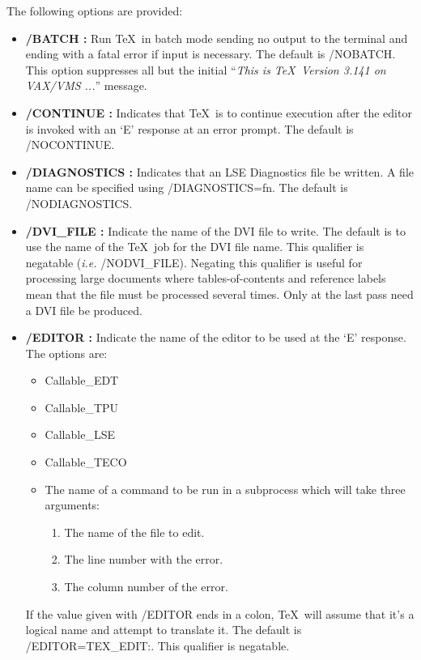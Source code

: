 The following options are provided:
\begin{itemize}

\item  {\bf   /BATCH :} Run \TeX\ in batch mode sending no output to the
terminal and ending with a fatal error if input is necessary. The default 
is /NOBATCH. This option suppresses all but the initial ``{\em This is \TeX\,
Version 3.141 on VAX/VMS ...}\/'' message.

\item  {\bf   /CONTINUE :} Indicates that \TeX\ is to continue execution after
the editor is invoked with an `E' response at an error prompt. The default is 
/NOCONTINUE.

\item  {\bf   /DIAGNOSTICS :} Indicates that an LSE Diagnostics file be
written. A file name can be specified using /DIAGNOSTICS=fn. The default is 
/NODIAGNOSTICS.

\item  {\bf   /DVI\_FILE :} Indicate the name of the DVI file to write.
The default is to use the name of the \TeX\ job for the DVI file name. 
This qualifier is negatable ({\em i.e.} /NODVI\_FILE). Negating this qualifier 
is useful for processing large documents where tables-of-contents and 
reference labels mean that the file must be processed several times. Only at 
the last pass need a DVI file be produced.

\item  {\bf   /EDITOR :} Indicate the name of the editor to be used at the `E'
response. The options are:
\begin{itemize}
\item Callable\_EDT
\item Callable\_TPU
\item Callable\_LSE
\item Callable\_TECO
\item The name of a command to be run in a subprocess which will 
take three arguments:
\begin{enumerate}
\item The name of the file to edit.
\item The line number with the error.
\item The column number of the error.
\end{enumerate}
\end{itemize}
If the value given with /EDITOR ends in a colon, \TeX\ will assume that it's 
a logical name and attempt to translate it. The default is /EDITOR=TEX\_EDIT:. 
This qualifier is negatable.


\end{itemize}
